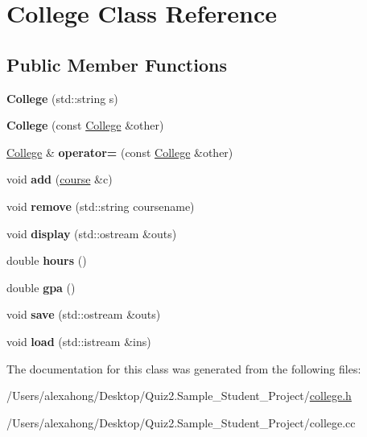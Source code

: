 \hypertarget{class_college}{}\section{College Class Reference}
\label{class_college}
\subsection*{Public Member Functions}
\begin{DoxyCompactItemize}
\item 
\mbox{\label{class_college_adabaf4087355e83f9f7d39f1e1498b41}} 
{\bfseries College} (std\+::string s)
\item 
\mbox{\label{class_college_ad007ad488e5a7ef986114080d0c8e101}} 
{\bfseries College} (const \hyperlink{class_college}{College} \&other)
\item 
\mbox{\label{class_college_af2194c9b37f80d13dc3fdba6784b18e8}} 
\hyperlink{class_college}{College} \& {\bfseries operator=} (const \hyperlink{class_college}{College} \&other)
\item 
\mbox{\label{class_college_a67fd1d8970b46b24ce2e0dd72598a22f}} 
void {\bfseries add} (\hyperlink{classcourse}{course} \&c)
\item 
\mbox{\label{class_college_a4d2ae513b36e6421fb1ca2c08459cfe6}} 
void {\bfseries remove} (std\+::string coursename)
\item 
\mbox{\label{class_college_a52ca0a164483cf5c05591cd0fb8b300c}} 
void {\bfseries display} (std\+::ostream \&outs)
\item 
\mbox{\label{class_college_a8a7a762611a1d7e00c453390d49355fd}} 
double {\bfseries hours} ()
\item 
\mbox{\label{class_college_aaf9bfaa0bc717e96da6365661a96fcd0}} 
double {\bfseries gpa} ()
\item 
\mbox{\label{class_college_af6b419f813bc990c0e11f99b78a26899}} 
void {\bfseries save} (std\+::ostream \&outs)
\item 
\mbox{\label{class_college_a11422094ddd907705daede7aa537dd73}} 
void {\bfseries load} (std\+::istream \&ins)
\end{DoxyCompactItemize}


The documentation for this class was generated from the following files\+:\begin{DoxyCompactItemize}
\item 
/\+Users/alexahong/\+Desktop/\+Quiz2.\+Sample\+\_\+\+Student\+\_\+\+Project/\hyperlink{college_8h}{college.\+h}\item 
/\+Users/alexahong/\+Desktop/\+Quiz2.\+Sample\+\_\+\+Student\+\_\+\+Project/college.\+cc\end{DoxyCompactItemize}
